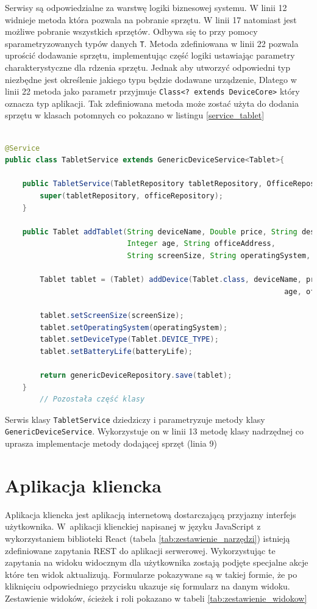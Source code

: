Serwisy są odpowiedzialne za warstwę logiki biznesowej systemu. W linii 12 widnieje metoda która pozwala na pobranie sprzętu. W linii 17 natomiast jest możliwe pobranie wszystkich sprzętów. Odbywa się to przy pomocy sparametryzowanych typów danych \texttt{T}. Metoda zdefiniowana w linii 22 pozwala uprościć dodawanie sprzętu, implementując część logiki ustawiając parametry charakterystyczne dla rdzenia sprzętu. Jednak aby utworzyć odpowiedni typ niezbędne jest określenie jakiego typu będzie dodawane urządzenie, Dlatego w linii 22 metoda jako parametr przyjmuje \texttt{Class<? extends DeviceCore>} który oznacza typ aplikacji. Tak zdefiniowana metoda może zostać użyta do dodania sprzętu w klasach potomnych co pokazano w listingu \ref{service_tablet}

\begin{lstlisting}[language=Java, style=JavaStyle,  caption={Klasa potomna serwisu tabletu: TabletService }, label={service_tablet}]

@Service
public class TabletService extends GenericDeviceService<Tablet>{

    public TabletService(TabletRepository tabletRepository, OfficeRepository officeRepository){
        super(tabletRepository, officeRepository);
    }

    public Tablet addTablet(String deviceName, Double price, String description,
                            Integer age, String officeAddress,
                            String screenSize, String operatingSystem, String batteryLife){

        Tablet tablet = (Tablet) addDevice(Tablet.class, deviceName, price, description,
                                                                age, officeAddress);

        tablet.setScreenSize(screenSize);
        tablet.setOperatingSystem(operatingSystem);
        tablet.setDeviceType(Tablet.DEVICE_TYPE);
        tablet.setBatteryLife(batteryLife);

        return genericDeviceRepository.save(tablet);
    }
		// Pozostała część klasy
\end{lstlisting}

Serwis klasy \texttt{TabletService} dziedziczy i parametryzuje metody klasy \texttt{GenericDeviceService}. Wykorzystuje on w linii 13 metodę klasy nadrzędnej co uprasza implementacje metody dodającej sprzęt (linia 9)



\section {Aplikacja kliencka}
Aplikacja kliencka jest aplikacją internetową dostarczającą przyjazny interfejs użytkownika. W~aplikacji klienckiej napisanej w języku JavaScript z wykorzystaniem biblioteki React (tabela \ref{tab:zestawienie_narzędzi}) istnieją zdefiniowane zapytania REST do aplikacji serwerowej. Wykorzystując te zapytania na widoku widocznym dla użytkownika zostają podjęte specjalne akcje które ten widok aktualizują. Formularze pokazywane są w takiej formie, że po kliknięciu odpowiedniego przycisku ukazuje się formularz na danym widoku. Zestawienie widoków, ścieżek i roli pokazano w tabeli \ref{tab:zestawienie_widokow}

